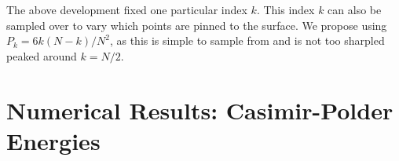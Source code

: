 The above development fixed one particular index $k$.  This index $k$ can also be sampled over to vary
which points are pinned to the surface.  We propose using $P_k= 6 k(N-k)/N^2$, as this is simple to sample
from and is not too sharpled peaked around $k=N/2$.



\section{Numerical Results: Casimir-Polder Energies}







